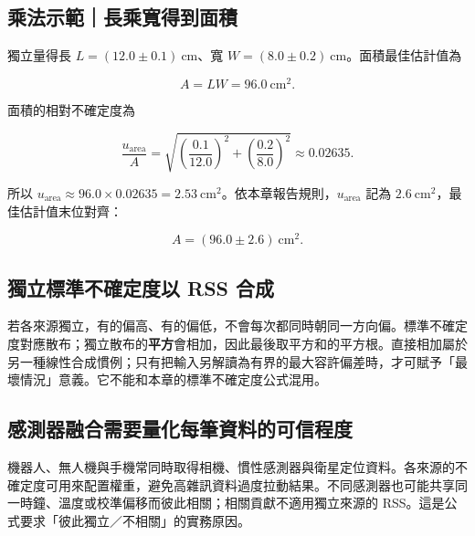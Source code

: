 \documentclass[11pt,a4paper]{article}
\begin{document}
\begin{HandoutWorkedExample}

\subsection{乘法示範｜長乘寬得到面積}\label{ux4e58ux6cd5ux793aux7bc4ux9577ux4e58ux5becux5f97ux5230ux9762ux7a4d}

獨立量得長 \(L=(12.0\pm0.1)\ \mathrm{cm}\)、寬 \(W=(8.0\pm0.2)\ \mathrm{cm}\)。面積最佳估計值為

\[
A=LW=96.0\ \mathrm{cm^2}.
\]

面積的相對不確定度為

\[
\frac{u_{\mathrm{area}}}{A}
=\sqrt{\left(\frac{0.1}{12.0}\right)^2+
       \left(\frac{0.2}{8.0}\right)^2}
\approx0.02635.
\]

所以 \(u_{\mathrm{area}}\approx96.0\times0.02635=2.53\ \mathrm{cm^2}\)。依本章報告規則，\(u_{\mathrm{area}}\) 記為 \(2.6\ \mathrm{cm^2}\)，最佳估計值末位對齊：

\[
\boxed{A=(96.0\pm2.6)\ \mathrm{cm^2}}.
\]

\end{HandoutWorkedExample}

\subsection{獨立標準不確定度以 RSS 合成}\label{ux7368ux7acbux6a19ux6e96ux4e0dux78baux5b9aux5ea6ux4ee5-rss-ux5408ux6210}

若各來源獨立，有的偏高、有的偏低，不會每次都同時朝同一方向偏。標準不確定度對應散布；獨立散布的\textbf{平方}會相加，因此最後取平方和的平方根。直接相加屬於另一種線性合成慣例；只有把輸入另解讀為有界的最大容許偏差時，才可賦予「最壞情況」意義。它不能和本章的標準不確定度公式混用。

\subsection{感測器融合需要量化每筆資料的可信程度}\label{ux611fux6e2cux5668ux878dux5408ux9700ux8981ux91cfux5316ux6bcfux7b46ux8cc7ux6599ux7684ux53efux4fe1ux7a0bux5ea6}

機器人、無人機與手機常同時取得相機、慣性感測器與衛星定位資料。各來源的不確定度可用來配置權重，避免高雜訊資料過度拉動結果。不同感測器也可能共享同一時鐘、溫度或校準偏移而彼此相關；相關貢獻不適用獨立來源的 RSS。這是公式要求「彼此獨立／不相關」的實務原因。
\end{document}
